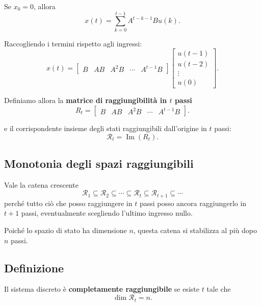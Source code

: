 Se \(x_0=0\), allora
\begin{equation}
x(t)=\sum_{k=0}^{t-1}A^{t-k-1}Bu(k).
\label{eq:L11_td_zero}
\end{equation}

Raccogliendo i termini rispetto agli ingressi:
\begin{equation}
x(t)=
\begin{bmatrix}
B & AB & A^2B & \cdots & A^{t-1}B
\end{bmatrix}
\begin{bmatrix}
u(t-1)\\
u(t-2)\\
\vdots\\
u(0)
\end{bmatrix}.
\label{eq:L11_td_fattorizzata}
\end{equation}

Definiamo allora la \textbf{matrice di raggiungibilità in \(t\) passi}
\begin{equation}
R_t=
\begin{bmatrix}
B & AB & A^2B & \cdots & A^{t-1}B
\end{bmatrix}.
\label{eq:L11_Rt}
\end{equation}

e il corrispondente insieme degli stati raggiungibili dall’origine in \(t\) passi:
\begin{equation}
\mathcal{R}_t=\operatorname{Im}(R_t).
\label{eq:L11_spazio_Rt}
\end{equation}

\subsection{Monotonia degli spazi raggiungibili}

Vale la catena crescente
\begin{equation}
\mathcal{R}_1\subseteq \mathcal{R}_2\subseteq \cdots \subseteq \mathcal{R}_t\subseteq \mathcal{R}_{t+1}\subseteq \cdots
\label{eq:L11_catena_Rt}
\end{equation}
perché tutto ciò che posso raggiungere in \(t\) passi posso ancora raggiungerlo in \(t+1\) passi, eventualmente scegliendo l’ultimo ingresso nullo.

Poiché lo spazio di stato ha dimensione \(n\), questa catena si stabilizza al più dopo \(n\) passi.

\subsection*{Definizione}
Il sistema discreto è \textbf{completamente raggiungibile} se esiste \(t\) tale che
\begin{equation}
\dim \mathcal{R}_t=n.
\label{eq:L11_completa_raggiungibilita_td}
\end{equation}

